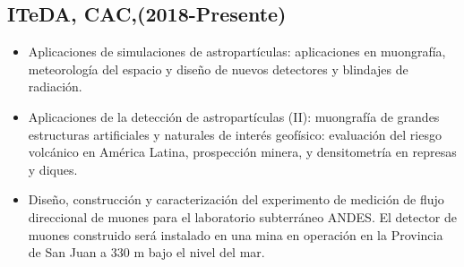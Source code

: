 \subsection*{ITeDA, CAC,(2018-Presente)}
\begin{itemize}
	\item Aplicaciones de simulaciones de astropartículas: aplicaciones en muongrafía, meteorología del espacio y diseño de nuevos detectores y blindajes de radiación.
	\item Aplicaciones de la detección de astropartículas (II): muongrafía de grandes estructuras artificiales y naturales de interés geofísico: evaluación del riesgo volcánico en América Latina, prospección minera, y densitometría en represas y diques.
	\item Diseño, construcción y caracterización del experimento de medición de flujo direccional de muones para el laboratorio subterráneo ANDES. El detector de muones construido será instalado en una mina en operación en la Provincia de San Juan a 330 m bajo el nivel del mar.
\end{itemize}


